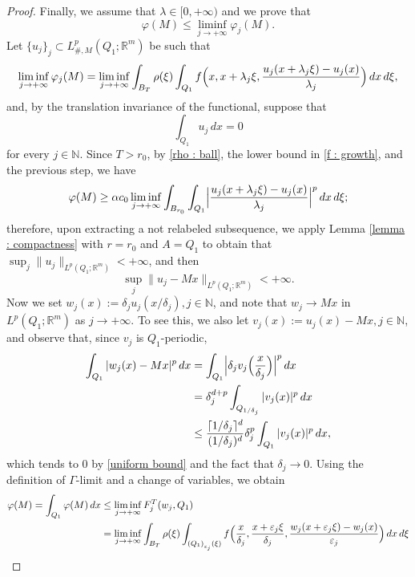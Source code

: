 \documentclass[10pt,a4paper]{amsart}
\newcommand{\N}{\mathbb{N}}
\newcommand{\R}{\mathbb{R}}
\newcommand{\dej}{\delta_j}
\newcommand{\ej}{\varepsilon_j}
\newcommand{\f}{\varphi}
\begin{document}
\begin{proof}
\smallskip

Finally, we assume that  $\lambda\in[0,+\infty)$ and  we prove that
\begin{equation}\label{cell lemma bis}
      \f(M) \leq \liminf_{j\to+\infty} \f_j(M).
\end{equation}
Let $\{u_j\}_j\subset L^p_{\#,M}(Q_1;\R^m)$ be such that 
\begin{equation*}
    \liminf_{j\to+\infty} \f_j(M) = \liminf_{j\to+\infty} \int_{B_T} \rho(\xi)\int_{Q_1} f\Bigl(x,x+\lambda_j\xi,\frac{u_j(x+\lambda_j\xi)-u_j(x)}{\lambda_j}\Bigr)\, dx\,d\xi, 
\end{equation*}
and, by the translation invariance of the functional, suppose that
\begin{equation*}
    \int_{Q_1}u_j\,dx=0
\end{equation*}
for every $j\in\N$. Since $T>r_0$, by \eqref{rho : ball}, the lower bound in \eqref{f : growth}, and the previous step, we have 
\begin{equation*}
\f(M)\geq \alpha c_0\liminf_{j\to+\infty} \int_{B_{r_0}} \int_{Q_1}\Bigl|\frac{u_j(x+\lambda_j\xi)-u_j(x)}{\lambda_j}\Bigr|^p \, dx\,d\xi;
\end{equation*}
therefore, upon extracting a not relabeled subsequence,  we apply Lemma \ref{lemma : compactness} with $r=r_0$ and $A=Q_1$ to obtain that $\sup_{j} \|u_j\|_{L^p(Q_1;\R^m)}<+\infty$, and then
\begin{equation}\label{uniform bound}
 \sup_{j} \|u_j-Mx\|_{L^p(Q_1;\R^m)}<+\infty.
\end{equation}
Now we set $w_j(x):=\dej u_j(x/\dej), j\in \N$, and note that $w_j\to Mx$ in $L^p(Q_1;\R^m)$ as $j\to+\infty$. To see this, we also let $v_j(x):=u_j(x)-Mx, j\in\N$, and observe that, since $v_j$ is $Q_1$-periodic, \begin{align*}
    \int_{Q_1}|w_j(x)-Mx|^p\,dx & = \int_{Q_1}\Bigl|\dej v_j\Bigl(\frac{x}{\dej}\Bigr)\Bigr|^p\,dx \\
    & = \dej^{d+p}\int_{Q_{1/\dej}} |v_j(x)|^p\, dx \\
    & \leq \frac{\lceil1/\dej\rceil^d} {(1/\dej)^d}\dej^p\int_{Q_1}|v_j(x)|^p\,dx,
\end{align*}
which tends to $0$ by \eqref{uniform bound} and the fact that $\dej\to0$. Using the definition of $\Gamma$-limit and a change of variables, we obtain
\begin{align*}
  \f(M) = \int_{Q_1} \f(M)\, dx & \leq \liminf_{j\to+\infty} F^T_j(w_j, Q_1) \\
    & = \liminf_{j\to+\infty} \int_{B_T} \rho(\xi)\int_{{(Q_1)}_{\ej}(\xi)} f\Bigl(\frac{x}{\dej},\frac{x+\ej\xi}{\dej},\frac{w_j(x+\ej\xi)-w_j(x)}{\ej}\Bigr)\, dx\,d\xi \\

\end{align*}
\end{proof}
\end{document}
